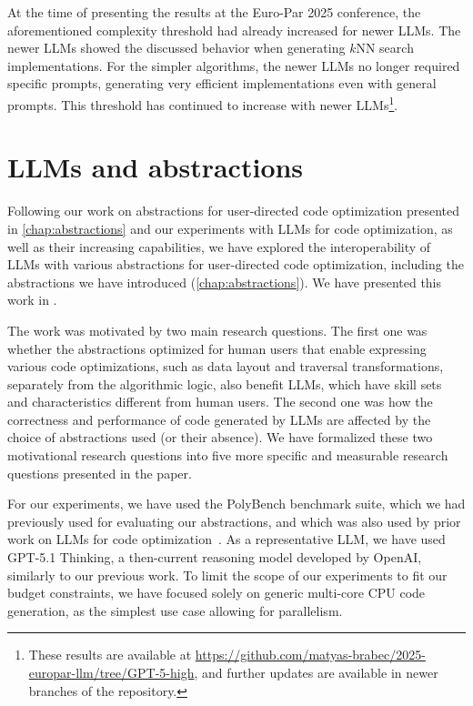 At the time of presenting the results at the Euro-Par 2025 conference, the aforementioned complexity threshold had already increased for newer LLMs. The newer LLMs showed the discussed behavior when generating $k$NN search implementations. For the simpler algorithms, the newer LLMs no longer required specific prompts, generating very efficient implementations even with general prompts. This threshold has continued to increase with newer LLMs\footnote{These results are available at \url{https://github.com/matyas-brabec/2025-europar-llm/tree/GPT-5-high}, and further updates are available in newer branches of the repository.}.


\section{LLMs and abstractions}\label{sec:llms-and-abstractions}

Following our work on abstractions for user-directed code optimization presented in \cref{chap:abstractions} and our experiments with LLMs for code optimization, as well as their increasing capabilities, we have explored the interoperability of LLMs with various abstractions for user-directed code optimization, including the abstractions we have introduced (\cref{chap:abstractions}). We have presented this work in .

The work was motivated by two main research questions. The first one was whether the abstractions optimized for human users that enable expressing various code optimizations, such as data layout and traversal transformations, separately from the algorithmic logic, also benefit LLMs, which have skill sets and characteristics different from human users. The second one was how the correctness and performance of code generated by LLMs are affected by the choice of abstractions used (or their absence). We have formalized these two motivational research questions into five more specific and measurable research questions presented in the paper.

For our experiments, we have used the PolyBench benchmark suite, which we had previously used for evaluating our abstractions, and which was also used by prior work on LLMs for code optimization~\cite{merouani2025agentic}. As a representative LLM, we have used GPT-5.1 Thinking, a then-current reasoning model developed by OpenAI, similarly to our previous work. To limit the scope of our experiments to fit our budget constraints, we have focused solely on generic multi-core CPU code generation, as the simplest use case allowing for parallelism.

